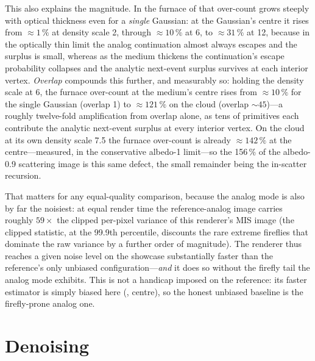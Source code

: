 This also explains the magnitude. In the furnace of  that over-count grows steeply with optical
thickness even for a \emph{single} Gaussian: at the Gaussian's centre it rises from ${\approx}\num{1}\,\%$
at density scale \num{2}, through ${\approx}\num{10}\,\%$ at \num{6}, to ${\approx}\num{31}\,\%$ at \num{12},
because in the optically thin
limit the analog continuation almost always escapes and the surplus is small, whereas as the medium
thickens the continuation's escape probability collapses and the analytic next-event surplus survives at
each interior vertex. \emph{Overlap} compounds this further, and measurably so: holding the density scale
at \num{6}, the furnace over-count at the medium's centre rises from ${\approx}\num{10}\,\%$ for the single
Gaussian (overlap \num{1}) to ${\approx}\num{121}\,\%$ on the cloud (overlap ${\sim}\num{45}$)---a roughly
twelve-fold amplification from overlap alone, as tens of primitives each contribute the analytic
next-event surplus at every interior vertex. On the cloud at its own density scale \num{7.5} the furnace
over-count is already ${\approx}\num{142}\,\%$ at the centre---measured, in the conservative albedo-\num{1}
limit---so the \num{+156}\,\% of the albedo-\num{0.9} scattering image is this same defect, the small
remainder being the in-scatter recursion.

That matters for any equal-quality comparison, because the analog mode is also by far
the noisiest: at equal render time the reference-analog image carries roughly \(59\times\) the
clipped per-pixel variance of this renderer's MIS image (the clipped statistic, at the
\num{99.9}th percentile, discounts the rare extreme fireflies that dominate the raw variance by a
further order of magnitude). The renderer thus reaches a given noise level on the showcase
substantially faster than the reference's only unbiased configuration---\emph{and} it does so without
the firefly tail the analog mode exhibits. This is not a handicap imposed on the reference: its faster
estimator is simply biased here (, centre), so the honest unbiased baseline is the
firefly-prone analog one.

\section{Denoising}
\label{sec:results-denoiser}

